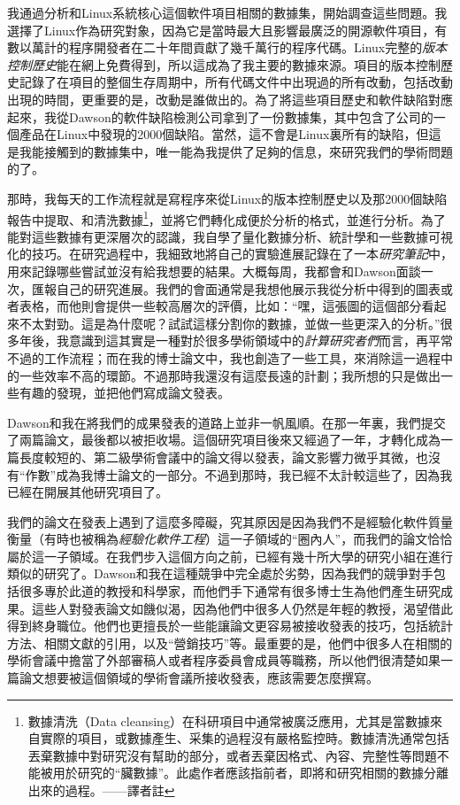 \documentclass[12pt,UTF8,nofonts]{book}
\begin{document}
我通過分析和Linux系統核心這個軟件項目相關的數據集，開始調查這些問題。我選擇了Linux作為研究對象，因為它是當時最大且影響最廣泛的開源軟件項目，有數以萬計的程序開發者在二十年間貢獻了幾千萬行的程序代碼。Linux完整的\emph{版本控制歷史}能在網上免費得到，所以這成為了我主要的數據來源。項目的版本控制歷史記錄了在項目的整個生存周期中，所有代碼文件中出現過的所有改動，包括改動出現的時間，更重要的是，改動是誰做出的。為了將這些項目歷史和軟件缺陷對應起來，我從Dawson的軟件缺陷檢測公司拿到了一份數據集，其中包含了公司的一個產品在Linux中發現的2000個缺陷。當然，這不會是Linux裏所有的缺陷，但這是我能接觸到的數據集中，唯一能為我提供了足夠的信息，來研究我們的學術問題的了。

那時，我每天的工作流程就是寫程序來從Linux的版本控制歷史以及那2000個缺陷報告中提取、和清洗數據\footnote{數據清洗（Data cleansing）在科研項目中通常被廣泛應用，尤其是當數據來自實際的項目，或數據產生、采集的過程沒有嚴格監控時。數據清洗通常包括丟棄數據中對研究沒有幫助的部分，或者丟棄因格式、內容、完整性等問題不能被用於研究的“臟數據”。此處作者應該指前者，即將和研究相關的數據分離出來的過程。——譯者註}，並將它們轉化成便於分析的格式，並進行分析。為了能對這些數據有更深層次的認識，我自學了量化數據分析、統計學和一些數據可視化的技巧。在研究過程中，我細致地將自己的實驗進展記錄在了一本\emph{研究筆記}中，用來記錄哪些嘗試並沒有給我想要的結果。大概每周，我都會和Dawson面談一次，匯報自己的研究進展。我們的會面通常是我想他展示我從分析中得到的圖表或者表格，而他則會提供一些較高層次的評價，比如：“嘿，這張圖的這個部分看起來不太對勁。這是為什麼呢？試試這樣分割你的數據，並做一些更深入的分析。”很多年後，我意識到這其實是一種對於很多學術領域中的\emph{計算研究者們}而言，再平常不過的工作流程；而在我的博士論文中，我也創造了一些工具，來消除這一過程中的一些效率不高的環節。不過那時我還沒有這麼長遠的計劃；我所想的只是做出一些有趣的發現，並把他們寫成論文發表。

\breakline

Dawson和我在將我們的成果發表的道路上並非一帆風順。在那一年裏，我們提交了兩篇論文，最後都以被拒收場。這個研究項目後來又經過了一年，才轉化成為一篇長度較短的、第二級學術會議中的論文得以發表，論文影響力微乎其微，也沒有“作數”成為我博士論文的一部分。不過到那時，我已經不太計較這些了，因為我已經在開展其他研究項目了。

我們的論文在發表上遇到了這麼多障礙，究其原因是因為我們不是經驗化軟件質量衡量（有時也被稱為\emph{經驗化軟件工程}）這一子領域的“圈內人”，而我們的論文恰恰屬於這一子領域。在我們步入這個方向之前，已經有幾十所大學的研究小組在進行類似的研究了。Dawson和我在這種競爭中完全處於劣勢，因為我們的競爭對手包括很多專於此道的教授和科學家，而他們手下通常有很多博士生為他們產生研究成果。這些人對發表論文如饑似渴，因為他們中很多人仍然是年輕的教授，渴望借此得到終身職位。他們也更擅長於一些能讓論文更容易被接收發表的技巧，包括統計方法、相關文獻的引用，以及“營銷技巧”等。最重要的是，他們中很多人在相關的學術會議中擔當了外部審稿人或者程序委員會成員等職務，所以他們很清楚如果一篇論文想要被這個領域的學術會議所接收發表，應該需要怎麼撰寫。
\end{document}
